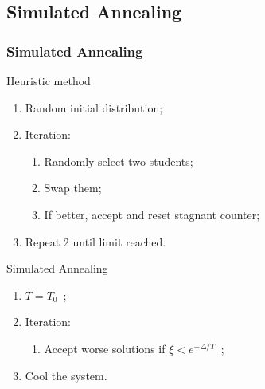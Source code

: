 \subsection{Simulated Annealing}
\begin{frame}
	\frametitle{Simulated Annealing}
	\begin{block}{Heuristic method}
		\begin{enumerate}
			\item{Random initial distribution;}
			\item{Iteration:
			\begin{enumerate}
				\item{Randomly select two students;}
				\item{Swap them;}
				\item{If better, accept and reset stagnant counter;}
			\end{enumerate}
			}
			\item{Repeat 2 until limit reached.}
		\end{enumerate}
	\end{block}
\pause
	\begin{block}{Simulated Annealing}
		\begin{enumerate}
			\item{$T=T_{0}\enspace$;}
			\item{Iteration:
			\begin{enumerate}
				\item{Accept worse solutions if $\xi < e^{- \Delta/T}\enspace$;}
			\end{enumerate}
			}
			\item{Cool the system.}
		\end{enumerate}
	\end{block}
\end{frame}
